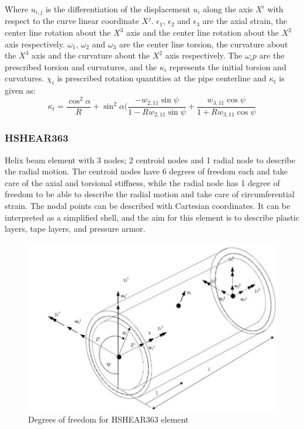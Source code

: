 \noindent Where $u_{i,j}$ is the differentiation of the displacement $u_i$ along the axis $X^i$ with respect to the curve linear coordinate $X^j$. $\epsilon_1$, $\epsilon_2$ and $\epsilon_3$ are the axial strain, the center line rotation about the $X^3$ axis and the center line rotation about the $X^2$ axis respectively. $\omega_1$, $\omega_2$ and $\omega_3$ are the center line torsion, the curvature about the $X^3$ axis and the curvature about the $X^2$ axis respectively. The $\omega_ip$ are the prescribed torsion and curvatures, and the $\kappa_i$ represents the initial torsion and curvatures. $\chi_i$ is prescribed rotation quantities at the pipe centerline and $\kappa_t$ is given as:
\begin{equation}
    \kappa_t=\frac{\cos^2\alpha}{R}+\sin^2 \alpha (\frac{-w_{2,11}\sin \psi }{1-R w_{2,11} \sin \psi} + \frac{w_{3,11}\cos \psi }{1+R w_{3,11} \cos \psi}
\end{equation}

\subsubsection{HSHEAR363}
Helix beam element with 3 nodes; 2 centroid nodes and 1 radial node to describe the radial motion. The centroid nodes have 6 degrees of freedom each and take care of the axial and torsional stiffness, while the radial node has 1 degree of freedom to be able to describe the radial motion and take care of circumferential strain.  The nodal points can be described with Cartesian coordinates. It can be interpreted as a simplified shell, and the aim for this element is to describe plastic layers, tape layers, and pressure armor. 

\begin{figure}[H]
\centering
\includegraphics[scale=0.5]{figures/hshear363}
\caption[$\; \:$HSHEAR363]{Degrees of freedom for HSHEAR363 element \cite{Bflextheory2013} }
 \label{fig:363}
\end{figure}

